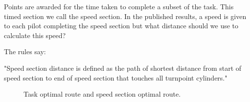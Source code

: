 \documentclass[gap.tex]{subfiles}
\begin{document}
\label{sec:speed-section-route}
Points are awarded for the time taken to complete a subset of the task. This
timed section we call the speed section. In the published results, a speed is
given to each pilot completing the speed section but what distance should we
use to calculate this speed?

The rules say:

"Speed section distance is defined as the path of shortest distance from start
of speed section to end of speed section that touches all turnpoint cylinders."

\begin{figure}[ht]
    \centering
    
    \caption{Task optimal route and speed section optimal route.}
    \label{fig:speed-section-optimal-route}
\end{figure}
\end{document}
